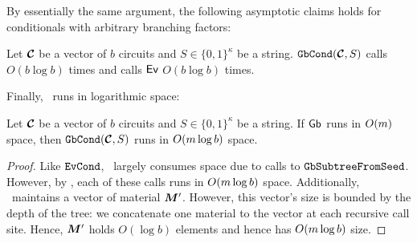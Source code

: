 By essentially the same argument, the following asymptotic claims holds
for conditionals with arbitrary branching factors:
\begin{lemma}\label{lemma:gbcondtime-general}
  Let $\vec{\cir}$ be a vector of $b$ circuits and $S \in \{0,
  1\}^\kappa$ be a string.
  $\gbcond(\vec{\cir}, S)$ calls \gGb\ $O(b \log b)$ times and calls
  $\textsf{Ev}$ $O(b\log b)$ times.
\end{lemma}

Finally, \gbcond\ runs in logarithmic space:
\begin{lemma}\label{lemma:gbcondspace}
  Let $\vec{\cir}$ be a vector of $b$ circuits and $S \in \{0, 1\}^\kappa$ be a string.
  If $\textsf{Gb}$ runs in $O(m)$ space, then
  $\gbcond(\vec{\cir}, S)$ runs in $O(m \log b)$ space.
\end{lemma}
\begin{proof}
  Like $\mathtt{EvCond}$, \gbcond\ largely consumes space due to calls to
  $\mathtt{GbSubtreeFromSeed}$. However, by , each of these calls
  runs in $O(m \log b)$ space.
  Additionally, \computegarbage\ maintains a vector of material
  $\vec{\mat}'$.
  However, this vector's size is bounded by the depth of the tree: we
  concatenate one material to the vector at each recursive call
  site.
  Hence, $\vec{\mat}'$ holds $O(\log b)$ elements and hence has
  $O(m \log b)$ size.
\end{proof}
